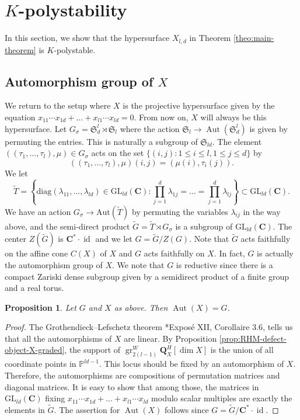\documentclass[letterpaper,11pt]{amsart}
\theoremstyle{plain}
\newtheorem{prop}[theo]{Proposition}
\theoremstyle{definition}
\theoremstyle{remark}
\newcommand{\PP}{\mathbb{P}}
\newcommand{\QQ}{\mathbf{Q}}
\newcommand{\CC}{\mathbf{C}}
\newcommand{\sta}{^{*}}
\DeclareMathOperator{\Aut}{Aut}
\DeclareMathOperator{\id}{id}
\DeclareMathOperator{\gr}{gr}
\begin{document}
    \section{$K$-polystability}
    In this section, we show that the hypersurface $X_{l,d}$ in Theorem \ref{theo:main-theorem} is $K$-polystable. 

    \subsection{Automorphism group of $X$} We return to the setup where $X$ is the projective hypersurface given by the equation $x_{11} \cdots x_{1d} + \ldots + x_{l1} \cdots x_{ld} = 0$. From now on, $X$ will always be this hypersurface. Let $G_{\sigma} = \mathfrak{S}_{d}^{l} \rtimes \mathfrak{S}_{l}$ where the action $\mathfrak{S}_{l} \to \Aut(\mathfrak{S}_{d}^{l})$ is given by permuting the entries. This is naturally a subgroup of $\mathfrak{S}_{ld}$. The element $((\tau_{1},\ldots, \tau_{l}), \mu) \in G_{\sigma}$ acts on the set $\{ (i,j) : 1 \leq i \leq l, 1 \leq j \leq d\}$ by
    $$ ((\tau_{1},\ldots, \tau_{l}), \mu) (i,j) = (\mu(i), \tau_{i}(j)). $$
    We let
    $$ \widetilde{T} = \left\{ \mathrm{diag}(\lambda_{11},\ldots, \lambda_{ld}) \in \mathrm{GL}_{ld}(\CC) : \prod_{j=1}^{d} \lambda_{1j} = \ldots = \prod_{j=1}^{d} \lambda_{lj} \right\} \subset \mathrm{GL}_{ld}(\CC).$$
    We have an action $G_{\sigma} \to \mathrm{Aut}(\widetilde{T})$ by permuting the variables $\lambda_{ij}$ in the way above, and the semi-direct product $\widetilde{G} = \widetilde{T}\rtimes G_{\sigma}$ is a subgroup of $\mathrm{GL}_{ld}(\CC)$. The center $Z(\widetilde{G})$ is $\CC\sta \cdot \id$ and we let $G = \widetilde{G}/ Z(G)$. Note that $\widetilde{G}$ acts faithfully on the affine cone $C(X)$ of $X$ and $G$ acts faithfully on $X$. In fact, $G$ is actually the automorphism group of $X$. We note that $G$ is reductive since there is a compact Zariski dense subgroup given by a semidirect product of a finite group and a real torus.

    \begin{prop} \label{prop:automorphism-of-X}
        Let $G$ and $X$ as above. Then $\Aut(X) = G$.
    \end{prop}
    \begin{proof}
        The Grothendieck--Lefschetz theorem \cite{Grothendieck-SGA2}*{Exposé XII, Corollaire 3.6}, tells us that all the automorphisms of $X$ are linear. By Proposition \ref{prop:RHM-defect-object-X-graded}, the support of $\gr_{2(l-1)}^{W} \QQ_{X}^{H}[\dim X]$ is the union of all coordinate points in $\PP^{ld-1}$. This locus should be fixed by an automorphism of $X$. Therefore, the automorphisms are compositions of permutation matrices and diagonal matrices. It is easy to show that among those, the matrices in $\mathrm{GL}_{ld}(\CC)$ fixing $x_{11} \cdots x_{1d} + \ldots + x_{l1} \cdots x_{ld}$ modulo scalar multiples are exactly the elements in $\widetilde{G}$. The assertion for $\Aut(X)$ follows since $G = \widetilde{G}/\CC\sta \cdot \id$.
    \end{proof}
\end{document}

